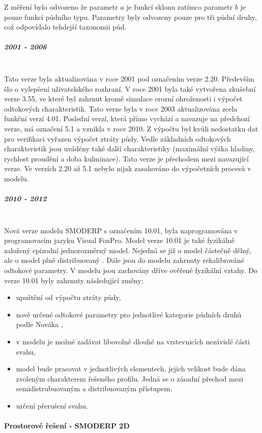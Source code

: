 Z měření bylo odvozeno že parametr $a$ je funkcí sklonu zatímco parametr $b$ je pouze funkcí půdního typu. Parametry byly odvozeny pouze pro tři půdní druhy, což odpovídalo tehdejší taxonomii půd.
\subparagraph{2001 - 2006}  \mbox{} \\
Tato verze byla aktualizována v roce 2001 pod označením verze 2.20. Především šlo o vylepšení uživatelského rozhraní. V roce 2001 byla také vytvořena zkušební verze 3.55, ve které byl zahrnut kromě simulace erozní ohroženosti i výpočet odtokových charakteristik. Tato verze byla v roce 2003 aktualizována zcela funkční verzí 4.01. Poslední verzí, která přímo vychází a navazuje na předchozí verze, má označení 5.1 a vznikla v roce 2010. Z výpočtu byl kvůli nedostatku dat pro verifikaci vyřazen výpočet ztráty půdy. Vedle základních odtokových charakteristik jsou uváděny také další charakteristiky (maximální výška hladiny, rychlost proudění a doba kulminace). Tato verze je přechodem mezi navazující verze. Ve verzích 2.20 až 5.1 nebylo nijak zasahováno do výpočetních procesů v modelu.
\subparagraph{2010 - 2012}  \mbox{} \\
Nová verze modelu SMODERP s označením 10.01, byla naprogramována v programovacím jazyku Visual FoxPro. Model verze 10.01 je také fyzikálně založený epizodní jednorozměrný model. Nejedná se již o model částečně dělný, ale o model plně distribuovaný . Dále jsou do modelu zahrnuty rekalibrováné odtokové parametry. V modelu jsou zachovány dříve ověřené fyzikální vztahy. Do verze 10.01 byly zahrnuty následující změny:
\begin{itemize}
\item upuštění od výpočtu ztráty půdy,
\item nově určené odtokové parametry pro jednotlivé kategorie půdních druhů podle Nováka \cite{Nemecek2011},
\item v modelu je možné zadávat libovolně dlouhé na vrstevnicích nezávislé části svahu,
\item model bude pracovat v jednotlivých elementech, jejich velikost bude dána zvoleným charakterem řešeného profilu. Jedná se o zásadní přechod mezi semidistrubuovaným a distribuovaným přístupem,
\item určení přerušení svahu.
\end{itemize}

\paragraph{Prostorové řešení - SMODERP 2D} \mbox{} \\

